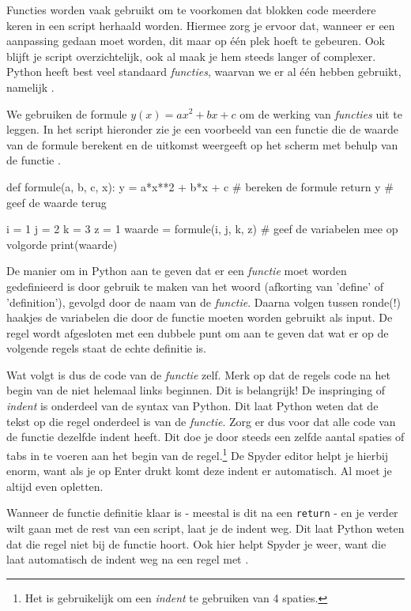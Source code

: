 \documentclass[a4paper,11pt, fleqn]{article}
\begin{document}
Functies worden vaak gebruikt om te voorkomen dat blokken code meerdere keren in een script herhaald worden. 
Hiermee zorg je ervoor dat, wanneer er een aanpassing gedaan moet worden, dit maar op \'e\'en plek hoeft te gebeuren. 
Ook blijft je script overzichtelijk, ook al maak je hem steeds langer of complexer. 
Python heeft best veel standaard \textit{functies}, waarvan we er al \'e\'en hebben gebruikt, namelijk . 

We gebruiken de formule $y(x) = a x^2+b x + c$ om de werking van \textit{functies} uit te leggen. In het script hieronder zie je een voorbeeld van een functie die de waarde van de formule berekent en de uitkomst weergeeft op het scherm met behulp van de functie .

\begin{python}
def formule(a, b, c, x):
    y = a*x**2 + b*x + c	 # bereken de formule
    return y				 # geef de waarde terug

i = 1
j = 2
k = 3
z = 1
waarde = formule(i, j, k, z) # geef de variabelen mee op volgorde
print(waarde)
\end{python} 

De manier om in Python aan te geven dat er een \textit{functie} moet worden gedefinieerd is door gebruik te maken van het woord  (afkorting van 'define' of 'definition'), gevolgd door de naam van de \textit{functie}. Daarna volgen tussen ronde(!) haakjes de variabelen die door de functie moeten worden gebruikt als input. De regel wordt afgesloten met een dubbele punt om aan te geven dat wat er op de volgende regels staat de echte definitie is. 

Wat volgt is dus de code van de \textit{functie} zelf. Merk op dat de regels code na het begin van de  niet helemaal links beginnen. Dit is belangrijk! De inspringing of \textit{indent} is onderdeel van de syntax van Python. Dit laat Python weten dat de tekst op die regel onderdeel is van de \textit{functie}. Zorg er dus voor dat alle code van de functie dezelfde indent heeft. Dit doe je door steeds een zelfde aantal spaties of tabs in te voeren aan het begin van de regel.\footnote{Het is gebruikelijk om een \textit{indent} te gebruiken van 4 spaties.} De Spyder editor helpt je hierbij enorm, want als je op Enter drukt komt deze indent er automatisch. Al moet je altijd even opletten.

Wanneer de functie definitie klaar is - meestal is dit na een \verb,return, - en je verder wilt gaan met de rest van een script, laat je de indent weg. Dit laat Python weten dat die regel niet bij de functie hoort. Ook hier helpt Spyder je weer, want die laat automatisch de indent weg na een regel met .
\end{document}
